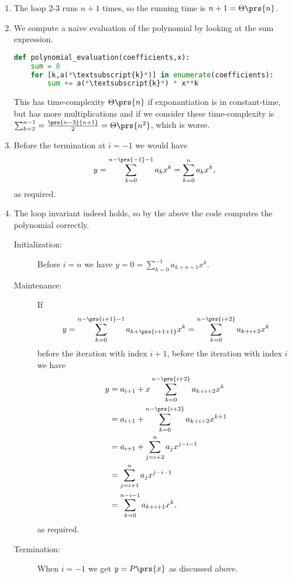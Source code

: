 \documentclass[oneside]{scrbook}
\theoremstyle{definition}
\begin{document}
\begin{problem}
\begin{enumerate}[label = \alph*.]
\item
The loop 2-3 runs $n+1$ times, so the running time is $n+1 = \Theta\prs{n}$.

\item We compute a naive evaluation of the polynomial by looking at the sum expression.

\begin{lstlisting}[language=Python]
def polynomial_evaluation(coefficients,x):
	sum = 0
	for [k,a(*\textsubscript{k}*)] in enumerate(coefficients):
		sum += a(*\textsubscript{k}*) * x**k
\end{lstlisting}
This has time-complexity $\Theta\prs{n}$ if exponantiation is in constant-time, but has more multiplications and if we consider these time-complexity is $\sum_{k = 2}^{n-1} = \frac{\prs{n-3}{n+1}}{2} = \Theta\prs{n^2}$, which is worse.

\item
Before the termination at $i = -1$ we would have \[y = \sum_{k=0}^{n - \prs{-1} - 1} a_k x^k = \sum_{k=0}^n a_k x^k \text{,}\]
as required.

\item The loop invariant indeed holds, so by the above the code computes the polynomial correctly.

\begin{description}
\item[Initialization:]
Before $i=n$ we have $y = 0 = \sum_{k=0}^{-1} a_{k+n+1} x^k$.

\item[Maintenance:]
If \[y = \sum_{k=0}^{n-\prs{i+1}-1} a_{k+\prs{{i+1}+1}} x^k = \sum_{k=0}^{n-\prs{i+2}} a_{k+i+2} x^k\] before the iteration with index $i+1$, before the iteration with index $i$ we have
\begin{align*}
	y &= a_{i+1} + x \sum_{k=0}^{n-\prs{i+2}} a_{k+i+2} x^k
	\\&=
	a_{i+1} + \sum_{k=0}^{n-\prs{i+2}} a_{k+i+2} x^{k+1}
	\\&=
	a_{i+1} + \sum_{j=i+2}^{n} a_j x^{j-i-1}
	\\&=
	\sum_{j=i+1}^n a_j x^{j-i-1}
	\\&=
	\sum_{k=0}^{n-i-1} a_{k+i+1} x^k \text{,}
\end{align*}
as required.

\item[Termination:]
When $i = -1$ we get $y = P\prs{x}$ as discussed above.
\end{description}
\end{enumerate}
\end{problem}
\end{document}
